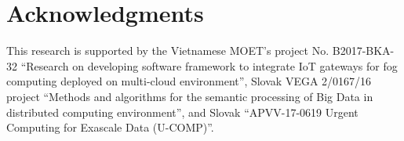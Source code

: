 \documentclass[conference]{IEEEtran}
\begin{document}
\section*{Acknowledgments} This research is supported by
the Vietnamese MOET's project No. B2017-BKA-32 ``Research on developing software framework to integrate IoT gateways for fog computing deployed on multi-cloud environment'',
Slovak VEGA 2/0167/16 project ``Methods and algorithms for the semantic processing of Big Data in distributed computing environment'', and Slovak ``APVV-17-0619 Urgent Computing for Exascale Data (U-COMP)''.

%

%
%
%
\end{document}
